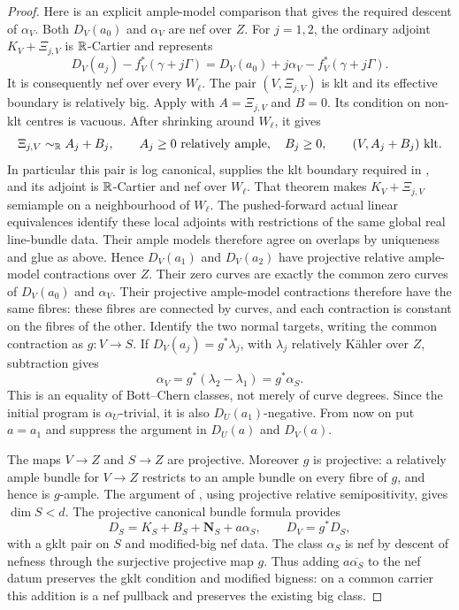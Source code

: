 \begin{proof}
Here is an explicit ample-model comparison that gives the required
descent of $\alpha_V$. Both $D_V(a_0)$ and $\alpha_V$ are nef over
$Z$. For $j=1,2$, the ordinary adjoint $K_V+\Xi_{j,V}$ is
$\mathbb R$-Cartier and represents
\[
 D_V(a_j)-f_V^*(\gamma+j\Gamma)
   =D_V(a_0)+j\alpha_V-f_V^*(\gamma+j\Gamma).
\]
It is consequently nef over every $W_\ell$. The pair
$(V,\Xi_{j,V})$ is klt and its effective boundary is relatively
big. Apply \cite[Lemma~11.15]{Fujino2022} with
$A=\Xi_{j,V}$ and $B=0$. Its condition on non-klt centres is
vacuous. After shrinking around $W_\ell$, it gives
\[
 \Xi_{j,V}\sim_{\mathbb R}A_j+B_j,\qquad
 A_j\geq0\ \text{relatively ample},\quad B_j\geq0,
 \qquad (V,A_j+B_j)\ \text{klt}.
\]
In particular this pair is log canonical, supplies the klt boundary
required in \cite[Theorem~8.3]{Fujino2022}, and its adjoint is
$\mathbb R$-Cartier and nef over $W_\ell$. That theorem makes
$K_V+\Xi_{j,V}$ semiample on a neighbourhood of $W_\ell$.
The pushed-forward actual linear equivalences identify these local
adjoints with restrictions of the same global real line-bundle
data. Their ample models therefore agree on overlaps by uniqueness
and glue as above. Hence $D_V(a_1)$ and $D_V(a_2)$ have projective
relative ample-model contractions over $Z$. Their zero curves are exactly the common zero
curves of $D_V(a_0)$ and $\alpha_V$. Their projective ample-model
contractions therefore have the same fibres: these fibres are
connected by curves, and each contraction is constant on the
fibres of the other. Identify the two normal targets, writing the
common contraction as $g:V\to S$. If
$D_V(a_j)=g^*\lambda_j$, with $\lambda_j$ relatively K\"ahler over
$Z$, subtraction gives
\[
 \alpha_V=g^*(\lambda_2-\lambda_1)=g^*\alpha_S.
\]
This is an equality of Bott--Chern classes, not merely of curve
degrees. Since the initial program is $\alpha_U$-trivial, it is
also $D_U(a_1)$-negative. From now on put $a=a_1$ and suppress
the argument in $D_U(a)$ and $D_V(a)$.

The maps $V\to Z$ and $S\to Z$ are projective. Moreover $g$ is
projective: a relatively ample bundle for $V\to Z$ restricts to
an ample bundle on every fibre of $g$, and hence is $g$-ample.
The argument of \cite[Theorem~4.1, Claim~4.2]{HX2026}, using
projective relative semipositivity, gives $\dim S<d$.
The projective canonical bundle formula
\cite[Theorem~2.53]{HX2026} provides
\[
 D_S=K_S+B_S+\mathbf N_S+a\alpha_S,
 \qquad D_V=g^*D_S,
\]
with a gklt pair on $S$ and modified-big nef data.
The class $\alpha_S$ is nef by descent of nefness through the
surjective projective map $g$.
Thus adding $a\overline{\alpha_S}$ to the nef datum preserves the
gklt condition and modified bigness: on a common carrier this
addition is a nef pullback and preserves the existing big class.


\end{proof}
